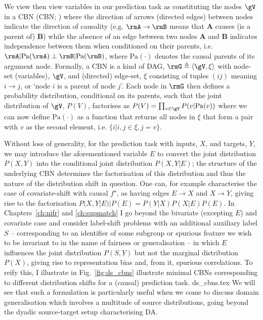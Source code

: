 We view then view variables in our prediction task as constituting the nodes \( \gV \) in a
\acl{CBN} (\acs{CBN}; \citealp{pearl1995bayesian}) where the direction of arrows (directed edges)
between nodes indicate the direction of causality (e.g. \(\rmA \to \rmB \) means that \textbf{A}
causes (is a parent of) \textbf{B}) while the absence of an edge between two nodes \textbf{A} and
\textbf{B} indicates independence between them when conditioned on their parents, i.e. \( \rmA |
\text{Pa}(\rmA) \perp \rmB | \text{Pa}(\rmB) \), where \( \text{Pa}(\cdot) \) denotes the causal
parents of its argument node.
%
Formally, a \ac{CBN} is a kind of \ac{DAG}, \(\rmG \triangleq \langle \gV, \xi
\rangle \) with node-set (variables), \(\gV\), and (directed) edge-set, \(\xi\) consisting of
tuples \((ij)\) meaning \(i \to j \), or `node \(i\) is a parent of node \(j\)'.
%
Each node in \( \rmG \) then defines a probability distribution, conditional on its parents, such that
the joint distribution of \(\gV\), \( P(V) \), factorises as \( P(V) = \prod_{v \in \gV} P(v |
\text{Pa}(v)) \) where we can now define \(\text{Pa}(\cdot)\) as a function that returns all nodes
in \(\xi\) that form a pair with \(v\) as the second element, i.e. \( \{ i | i,j \in \xi, j = v \}
\).
%

Without loss of generality, for the prediction task with inputs, \(X\), and targets, \(Y\), we may
introduce the aforementioned variable \(E\) to convert the joint distribution \(P(X, Y)\) into the
conditional joint distribution \( P(X, Y | E ) \); the structure of the underlying \ac{CBN} determines
the factorisation of this distribution and thus the nature of the distribution shift in question.
%
One can, for example characterise the case of covariate-shift with causal \(f^\star\), as having
edges  \(E \to X\) and \( X \to Y \), giving rise to the factorisation \( P(X, Y | E) | P(E) =
P(Y|X)P(X|E)P(E) \). 
%
In Chapters~\ref{ch:nifr} and \ref{ch:supmatch} I go beyond the bivariate (excepting \( E \)) and
covariate case and consider label-shift problems with an additional auxiliary label \(S\) --
corresponding to an identifier of some subgroup or spurious feature we wish to be invariant to in
the name of fairness or generalisation --  in which \(E\) influences the joint distribution \( P(S,
Y) \) but not the marginal distribution \(P(X)\), giving rise to representation bias and, from it,
spurious correlations.
%
To reify this, I illustrate in Fig.~\ref{fig:ds_cbns} illustrate minimal \acp{CBN} corresponding to
different distribution shifts for a (causal) prediction task.
%
{ds_cbns.tex}
%
We will see that such a formulation is particularly useful when we come to discuss domain
generalisation which involves a multitude of source distributions, going beyond the dyadic
source-target setup characterising DA.
%

